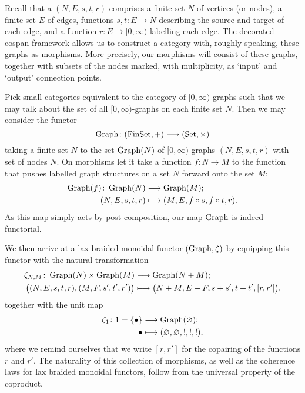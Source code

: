 Recall that a \define{$[0,\infty)$-graph} $(N,E,s,t,r)$ comprises a finite set
$N$ of vertices (or nodes), a finite set $E$ of edges, functions $s,t\colon  E \to N$
describing the source and target of each edge, and a function $r\colon  E \to
[0,\infty)$ labelling each edge. The decorated cospan framework allows us to
construct a category with, roughly speaking, these graphs as morphisms. More
precisely, our morphisms will consist of these graphs, together with subsets of
the nodes marked, with multiplicity, as `input' and `output' connection points.

Pick small categories equivalent to the category of $[0,\infty)$-graphs such
that we may talk about the set of all $[0,\infty)$-graphs on each finite set
$N$.  Then we may consider the functor
\[
  \operatorname{Graph}\colon  (\mathrm{FinSet},+) \longrightarrow (\mathrm{Set},\times)
\]
taking a finite set $N$ to the set $\operatorname{Graph}(N)$ of $[0,\infty)$-graphs
$(N,E,s,t,r)$ with set of nodes $N$. On
morphisms let it take a function $f\colon N \to M$ to the function that pushes
labelled graph structures on a set $N$ forward onto the set $M$:
\begin{align*}
  \operatorname{Graph}(f)\colon  \operatorname{Graph}(N) &\longrightarrow
  \operatorname{Graph}(M); \\
  (N,E,s,t,r) &\longmapsto (M,E,f \circ s, f \circ t, r).
\end{align*}
As this map simply acts by post-composition, our map $\operatorname{Graph}$ is indeed
functorial.

We then arrive at a lax braided monoidal functor $(\operatorname{Graph},\zeta)$ by equipping
this functor with the natural transformation 
\begin{align*}
  \zeta_{N,M}\colon  \operatorname{Graph}(N) \times \operatorname{Graph}(M)
  &\longrightarrow \operatorname{Graph}(N+M); \\
  \big( (N,E,s,t,r), (M,F,s',t',r') \big) &\longmapsto
  \big(N+M,E+F,s+s',t+t',[r,r']\big),
\end{align*}
together with the unit map
\begin{align*}
  \zeta_1\colon  1=\{\bullet\} &\longrightarrow \operatorname{Graph}(\varnothing); \\
  \bullet &\longmapsto
  (\varnothing,\varnothing,!,!,!),
\end{align*}
where we remind ourselves
that we write $[r,r']$ for the copairing of the functions $r$ and $r'$. The
naturality of this collection of morphisms, as well as the coherence laws for
lax braided monoidal functors, follow from the universal property of the coproduct.

